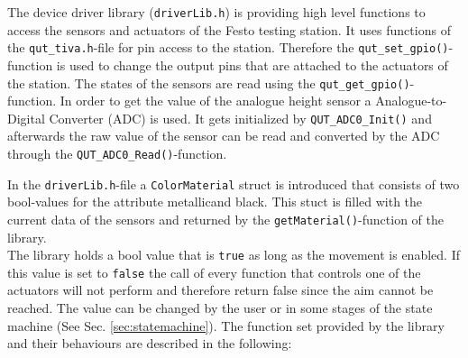 
The device driver library (\texttt{driverLib.h}) is providing high level functions to access the sensors and actuators of the Festo testing station. 
It uses functions of the \texttt{qut\_tiva.h}-file for pin access to the station. 
Therefore the \texttt{qut\_set\_gpio()}-function is used to change the output pins that are attached to the actuators of the station. The states of the sensors are read using the \texttt{qut\_get\_gpio()}-function. In order to get the value of the analogue height sensor a Analogue-to-Digital Converter (ADC) is used. It gets initialized by \texttt{QUT\_ADC0\_Init()} and afterwards the raw value of the sensor can be read and converted by the ADC through the \texttt{QUT\_ADC0\_Read()}-function. 

In the \texttt{driverLib.h}-file a \texttt{ColorMaterial} struct is introduced that consists of two bool-values for the attribute \glq metallic\grq and \glq black\grq. This stuct is filled with the current data of the sensors and returned by the \texttt{getMaterial()}-function of the library.\\

The library holds a bool value that is \texttt{true} as long as the movement is enabled. If this value is set to \texttt{false} the call of every function that controls one of the actuators will not perform and therefore return false since the aim cannot be reached. The value can be changed by the user or in some stages of the state machine (See Sec. \ref{sec:statemachine}). 
The function set provided by the library and their behaviours are described in the following: 

